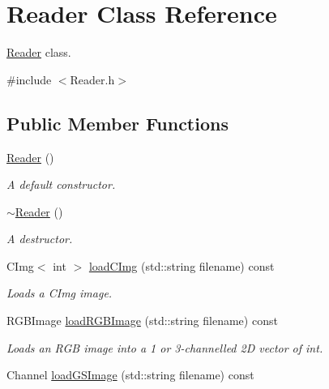 \hypertarget{class_reader}{}\section{Reader Class Reference}
\label{class_reader}


\hyperlink{class_reader}{Reader} class.  




{\ttfamily \#include $<$Reader.\+h$>$}

\subsection*{Public Member Functions}
\begin{DoxyCompactItemize}
\item 
\mbox{\label{class_reader_adcda31b507720ab44044d7a21686fba2}} 
\hyperlink{class_reader_adcda31b507720ab44044d7a21686fba2}{Reader} ()
\begin{DoxyCompactList}\small\item\em A default constructor. \end{DoxyCompactList}\item 
\mbox{\label{class_reader_a78089542fd27a0ac2df6702fffe8725c}} 
\hyperlink{class_reader_a78089542fd27a0ac2df6702fffe8725c}{$\sim$\+Reader} ()
\begin{DoxyCompactList}\small\item\em A destructor. \end{DoxyCompactList}\item 
C\+Img$<$ int $>$ \hyperlink{class_reader_a221d27e101af9d6a72f83099004f3aec}{load\+C\+Img} (std\+::string filename) const
\begin{DoxyCompactList}\small\item\em Loads a C\+Img image. \end{DoxyCompactList}\item 
R\+G\+B\+Image \hyperlink{class_reader_a107ec6bb4a34d2a865f9f27ea7768f15}{load\+R\+G\+B\+Image} (std\+::string filename) const
\begin{DoxyCompactList}\small\item\em Loads an R\+GB image into a 1 or 3-\/channelled 2D vector of int. \end{DoxyCompactList}\item 
Channel \hyperlink{class_reader_abe384ab426fbb3ab2345537072771b5f}{load\+G\+S\+Image} (std\+::string filename) const

\end{DoxyCompactItemize}
